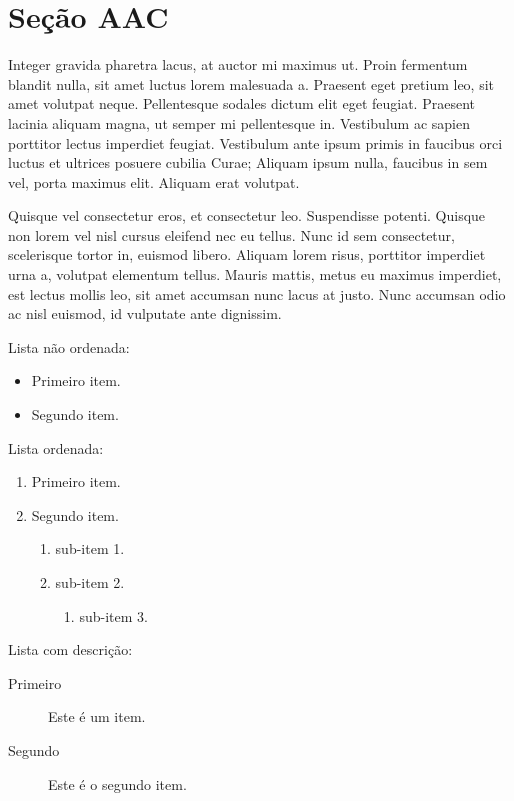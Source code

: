 \documentclass{article}
\begin{document}
	\section{Seção AAC}
	
	Integer gravida pharetra lacus, at auctor mi maximus ut. Proin fermentum blandit nulla, sit amet luctus lorem malesuada a. Praesent eget pretium leo, sit amet volutpat neque. Pellentesque sodales dictum elit eget feugiat. Praesent lacinia aliquam magna, ut semper mi pellentesque in. Vestibulum ac sapien porttitor lectus imperdiet feugiat. Vestibulum ante ipsum primis in faucibus orci luctus et ultrices posuere cubilia Curae; Aliquam ipsum nulla, faucibus in sem vel, porta maximus elit. Aliquam erat volutpat.
	
	Quisque vel consectetur eros, et consectetur leo. Suspendisse potenti. Quisque non lorem vel nisl cursus eleifend nec eu tellus. Nunc id sem consectetur, scelerisque tortor in, euismod libero. Aliquam lorem risus, porttitor imperdiet urna a, volutpat elementum tellus. Mauris mattis, metus eu maximus imperdiet, est lectus mollis leo, sit amet accumsan nunc lacus at justo. Nunc accumsan odio ac nisl euismod, id vulputate ante dignissim.
	
	Lista não ordenada:
	
	\begin{itemize}
		\item Primeiro item.
		\item Segundo item.
	\end{itemize}
	
	Lista ordenada:
	
	\begin{enumerate}
		\item Primeiro item.
		\item Segundo item.
		\begin{enumerate}
			\item sub-item 1.
			\item sub-item 2.
			\begin{enumerate}
				\item sub-item 3.
			\end{enumerate}
		\end{enumerate}
	\end{enumerate}
	
	Lista com descrição:
	
	\begin{description}
		\item[Primeiro] Este é um item.
		\item[Segundo] Este é o segundo item.
	\end{description}
	
\end{document}
